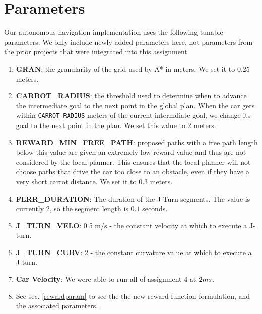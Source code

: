 \section{Parameters}

Our autonomous navigation implementation uses the following tunable parameters. We only include newly-added parameters here, not parameters from the prior projects that were integrated into this assignment. 

\begin{enumerate}
    \item \textbf{GRAN}: the granularity of the grid used by A* in meters. We set it to 0.25 meters.
    \item \textbf{CARROT\_RADIUS}: the threshold used to determine when to advance the intermediate goal to the next point in the global plan. When the car gets within {\tt CARROT\_RADIUS} meters of the current intermdiate goal, we change its goal to the next point in the plan. We set this value to 2 meters.
    \item \textbf{REWARD\_MIN\_FREE\_PATH}: proposed paths with a free path length below this value are given an extremely low reward value and thus are not considered by the local planner. This ensures that the local planner will not choose paths that drive the car too close to an obstacle, even if they have a very short carrot distance. We set it to 0.3 meters.
    \item \textbf{FLRR\_DURATION}: The duration of the J-Turn segments. The value is currently 2, so the segment length is $0.1$ seconds. 
    \item \textbf{J\_TURN\_VELO}: 0.5 m/s - the constant velocity at which to execute a J-turn. 
    \item \textbf{J\_TURN\_CURV}: 2 - the constant curvature value at which to execute a J-turn. 
    \item \textbf{Car Velocity}: We were able to run all of assignment 4 at $2 m\/s$.
    \item See sec. \ref{rewardparam} to see the the new reward function formulation, and the associated parameters.
\end{enumerate}